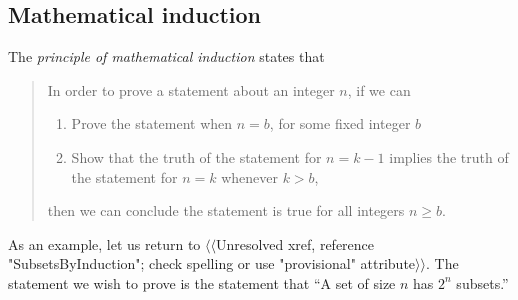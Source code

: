 \documentclass[10pt,]{book}
\theoremstyle{plain}
\theoremstyle{definition}
\numberwithin{equation}{chapter}
\begin{document}
\subsection[{Mathematical induction}]{Mathematical induction}\label{subsection-11}
\typeout{************************************************}
\typeout{************************************************}
The \emph{principle of mathematical induction} states that%
\begin{quote}In order to prove a statement about an integer \(n\), if we can \leavevmode%
\begin{enumerate}
\item\hypertarget{li-21}{}Prove the statement when \(n=b\), for some fixed integer \(b\)%
\item\hypertarget{li-22}{}Show that the truth of the statement for \(n=k-1\) implies the truth of the statement for \(n=k\) whenever \(k>b\),%
\end{enumerate}
 then we can conclude the statement is true for all integers \(n\ge
b\).\end{quote}
As an example, let us return to {$\langle\langle$Unresolved xref, reference "SubsetsByInduction"; check spelling or use "provisional" attribute$\rangle\rangle$}. The statement we wish to prove is the statement that ``A set of size \(n\) has \(2^n\) subsets.''%
\end{document}
